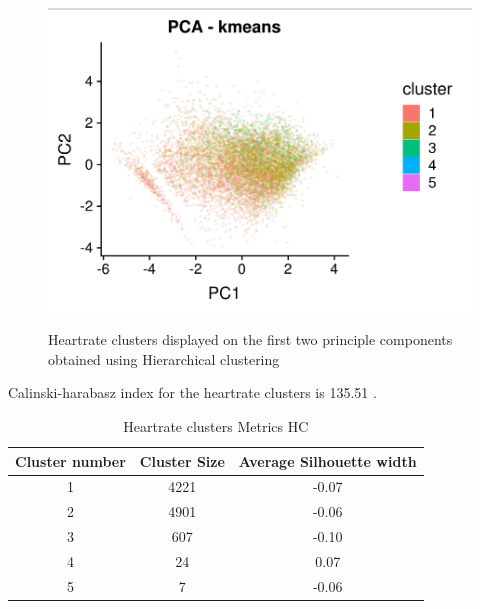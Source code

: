 \documentclass{article}
\begin{document}
\begin{figure}[htb]
  \centering
  \caption{Heartrate clusters displayed on the first two principle components obtained using Hierarchical clustering}
  \includegraphics[]{hr_HC_results.png}
  \label{fig:hrClustersHC}
\end{figure}

Calinski-harabasz index for the heartrate clusters is 135.51 .

\begin{table}[H]
  \caption{Heartrate clusters Metrics HC}
  \label{hr_metrics}
  \centering
  \begin{tabular}{ |c|c|c|}
    \toprule
    \cmidrule(r){1-2}
    Cluster number & Cluster Size & Average Silhouette width \\
    \hline
    1 & 4221 & -0.07 \\
    2 & 4901 & -0.06 \\
    3 & 607 & -0.10 \\
    4 & 24 & 0.07 \\
    5 & 7 & -0.06 \\
    \bottomrule
    \end{tabular}
\end{table}
\end{document}
